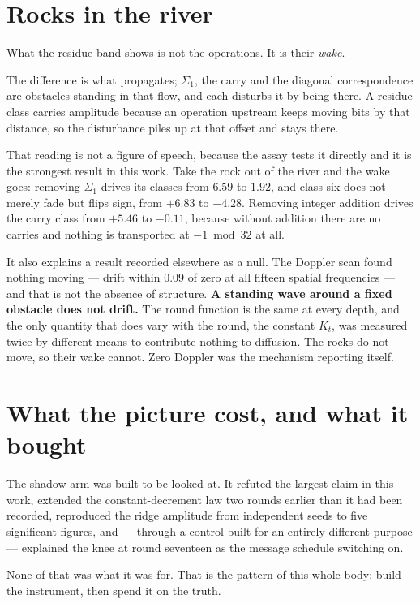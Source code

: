 \section{Rocks in the river}

What the residue band shows is not the operations. It is their \emph{wake}.

The difference is what propagates; \(\Sigma_1\), the carry and the diagonal correspondence are
obstacles standing in that flow, and each disturbs it by being there. A residue class carries
amplitude because an operation upstream keeps moving bits by that distance, so the disturbance
piles up at that offset and stays there.

That reading is not a figure of speech, because the assay tests it directly and it is the strongest
result in this work. Take the rock out of the river and the wake goes: removing \(\Sigma_1\) drives
its classes from \(6.59\) to \(1.92\), and class six does not merely fade but flips sign, from
\(+6.83\) to \(-4.28\). Removing integer addition drives the carry class from \(+5.46\) to
\(-0.11\), because without addition there are no carries and nothing is transported at
\(-1 \bmod 32\) at all.

It also explains a result recorded elsewhere as a null. The Doppler scan found nothing moving ---
drift within \(0.09\) of zero at all fifteen spatial frequencies --- and that is not the absence of
structure. \textbf{A standing wave around a fixed obstacle does not drift.} The round function is
the same at every depth, and the only quantity that does vary with the round, the constant \(K_t\), was
measured twice by different means to contribute nothing to diffusion. The rocks do not move, so
their wake cannot. Zero Doppler was the mechanism reporting itself.

\section{What the picture cost, and what it bought}

The shadow arm was built to be looked at. It refuted the largest claim in this work, extended the
constant-decrement law two rounds earlier than it had been recorded, reproduced the ridge amplitude
from independent seeds to five significant figures, and --- through a control built for an entirely
different purpose --- explained the knee at round seventeen as the message schedule switching on.

None of that was what it was for. That is the pattern of this whole body: build the instrument,
then spend it on the truth.
